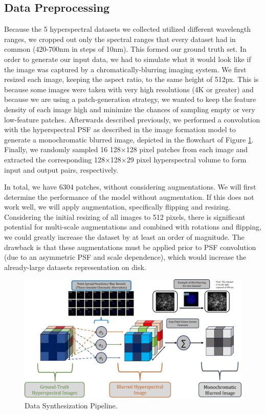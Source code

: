 \documentclass{article}
\begin{document}
\subsection{Data Preprocessing}
Because the 5 hyperspectral datasets we collected utilized different wavelength ranges, we cropped out only the spectral ranges that every dataset had in common (420-700nm in steps of 10nm). This formed our ground truth set. In order to generate our input data, we had to simulate what it would look like if the image was captured by a chromatically-blurring imaging system. We first resized each image, keeping the aspect ratio, to the same height of 512px. This is because some images were taken with very high resolutions (4K or greater) and because we are using a patch-generation strategy, we wanted to keep the feature density of each image high and minimize the chances of sampling empty or very low-feature patches. Afterwards described previously, we performed a convolution with the hyperspectral PSF as described in the image formation model to generate a monochromatic blurred image, depicted in the flowchart of Figure \ref{fig:data_pipeline}. Finally, we randomly sampled 16 128×128 pixel patches from each image and extracted the corresponding 128×128×29 pixel hyperspectral volume to form input and output pairs, respectively.

In total, we have 6304 patches, without considering augmentations. We will first determine the performance of the model without augmentation. If this does not work well, we will apply augmentation, specifically flipping and resizing. Considering the initial resizing of all images to 512 pixels, there is significant potential for multi-scale augmentations and combined with rotations and flipping, we could greatly increase the dataset by at least an order of magnitude. The drawback is that these augmentations must be applied prior to PSF convolution (due to an asymmetric PSF and scale dependence), which would increase the already-large datasets representation on disk.

\begin{figure}
  \centering
\includegraphics[width=\textwidth]{figs/data_synthesization/simulate_data_pipeline.png}
  \caption{Data Synthesization Pipeline.}
  \label{fig:data_pipeline}
\end{figure}
\end{document}
